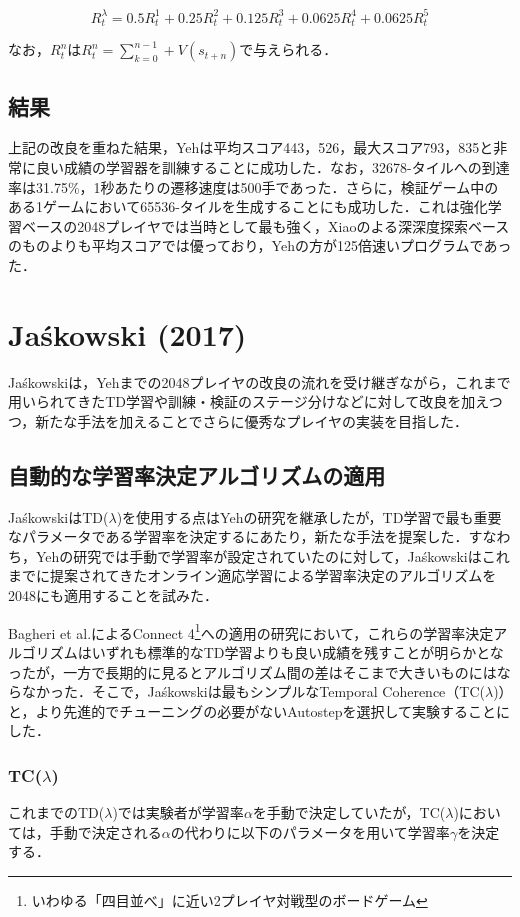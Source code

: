 \documentclass{suribt}
\begin{document}
\[
R^{\lambda}_t = 0.5R^1_t + 0.25R^2_t + 0.125R^3_t + 0.0625R^4_t + 0.0625R^5_t
\]

なお，$R^n_t$は$R^n_t = \sum_{k=0}^{n-1} + V(s_{t+n})$で与えられる．

\subsection{結果}
上記の改良を重ねた結果，Yehは平均スコア443，526，最大スコア793，835と非常に良い成績の学習器を訓練することに成功した．なお，32678-タイルへの到達率は31.75\%，1秒あたりの遷移速度は500手であった．さらに，検証ゲーム中のある1ゲームにおいて65536-タイルを生成することにも成功した．これは強化学習ベースの2048プレイヤでは当時として最も強く，Xiaoのよる深深度探索ベースのものよりも平均スコアでは優っており，Yehの方が125倍速いプログラムであった．

\section{Ja\'{s}kowski (2017)}
Ja\'{s}kowskiは，Yehまでの2048プレイヤの改良の流れを受け継ぎながら，これまで用いられてきたTD学習や訓練・検証のステージ分けなどに対して改良を加えつつ，新たな手法を加えることでさらに優秀なプレイヤの実装を目指した．

\subsection{自動的な学習率決定アルゴリズムの適用}
Ja\'{s}kowskiはTD(${\lambda}$)を使用する点はYehの研究を継承したが，TD学習で最も重要なパラメータである学習率を決定するにあたり，新たな手法を提案した．すなわち，Yehの研究では手動で学習率が設定されていたのに対して，Ja\'{s}kowskiはこれまでに提案されてきたオンライン適応学習による学習率決定のアルゴリズムを2048にも適用することを試みた．

Bagheri et al.によるConnect 4\footnote{いわゆる「四目並べ」に近い2プレイヤ対戦型のボードゲーム}への適用の研究において，これらの学習率決定アルゴリズムはいずれも標準的なTD学習よりも良い成績を残すことが明らかとなったが\cite{Bagheri}，一方で長期的に見るとアルゴリズム間の差はそこまで大きいものにはならなかった．そこで，Ja\'{s}kowskiは最もシンプルなTemporal Coherence（TC(${\lambda}$)）と，より先進的でチューニングの必要がないAutostepを選択して実験することにした．

\subsubsection{TC(${\lambda}$)}
これまでのTD(${\lambda}$)では実験者が学習率${\alpha}$を手動で決定していたが，TC(${\lambda}$)においては，手動で決定される${\alpha}$の代わりに以下のパラメータを用いて学習率${\gamma}$を決定する．
\end{document}
